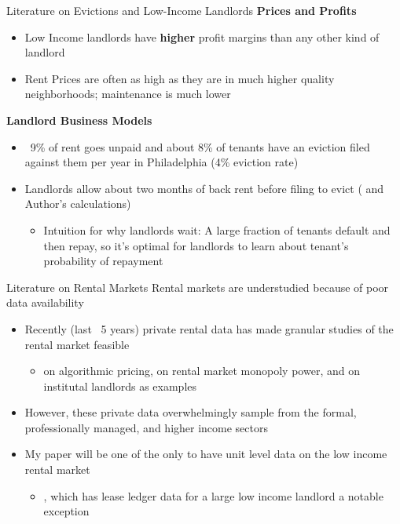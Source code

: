 \documentclass[10pt, xcolor=dvipsnames]{beamer}
\begin{document}

\begin{frame}{Literature on Evictions and Low-Income Landlords}
    \textbf{Prices and Profits}
        \begin{itemize}
                \item Low Income landlords have \textbf{higher} profit margins than any other kind of landlord \parencite{Desmond_2019, Damen_2025, Eisfeldt_2015}
                \item Rent Prices are often as high as they are in much higher quality neighborhoods; maintenance is much lower 
        \end{itemize}
    \pause 
    \textbf{Landlord Business Models}
    \begin{itemize}
        \item ~9\% of rent goes unpaid \parencite{collinson2024eviction} and about 8\% of tenants have an eviction filed against them per year in Philadelphia (4\% eviction rate)
        \item Landlords allow about two months of back rent before filing to evict (\cite{humphries-2024} and Author's calculations)
        \begin{itemize}
            \item Intuition for why landlords wait: A large fraction of tenants default and then repay, so it's optimal for landlords to learn about tenant's probability of repayment
        \end{itemize}
    \end{itemize}
    
\end{frame}

\begin{frame}{Literature on Rental Markets}
    Rental markets are understudied because of poor data availability\\
    \vspace{0.25cm}
    \begin{itemize}
        \item Recently (last ~5 years) private rental data has made granular studies of the rental market feasible
        \begin{itemize}
            \item \cite{calderwang2024algorithmic} on algorithmic pricing, \cite{framoutar2024market} on rental market monopoly power, and \cite{gurun-et-al-2022} on institutal landlords as examples
        \end{itemize}
        \item However, these private data overwhelmingly sample from the formal, professionally managed, and higher income sectors
        \item My paper will be one of the only to have unit level data on the low income rental market
        \begin{itemize}
            \item \cite{humphries-2024}, which has lease ledger data for a large low income landlord a notable exception
        \end{itemize}
    \end{itemize}
\end{frame}
\end{document}
